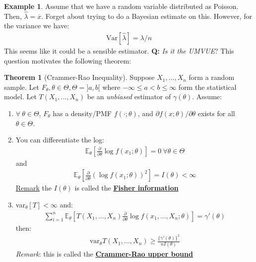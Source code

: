 \documentclass[11pt]{scrartcl}
\theoremstyle{definition}
\newtheorem{theorem}{Theorem}
\newtheorem{ex}{Example}
\theoremstyle{remark}
\newcommand{\dfn}[1]{\textbf{\underline{#1}}}
\newcommand{\EXth}[1]{\mathbb{E}_\theta \left[ #1 \right]}
\begin{document}
\begin{ex} 
Assume that we have a random variable distributed as Poisson. Then, $\hat{\lambda} = \overline{x}$. Forget about trying to do a Bayesian estimate on this. However, for the variance we have: 
	\begin{align*}
		\text{Var}[\hat{\lambda}] = \lambda / n 
	\end{align*}
	This seems like it could be a sensible estimator. \textbf{Q:} \emph{Is it the UMVUE}? This question motivates the following theorem: 
\end{ex}

\begin{theorem}[Crammer-Rao Inequality]
	Suppose $X_1, ..., X_n$ form a random sample. Let $F_\theta, \theta \in \Theta, \Theta = ]a,b[$ where $-\infty \leq a < b \leq \infty$ form the statistical model. Let $T(X_1, ..., X_n)$ be an \emph{unbiased} estimator of $\gamma(\theta)$. Assume: 
	\begin{enumerate}[noitemsep]
		\item $\forall\ \theta \in \Theta$, $F_\theta$ has a density/PMF $f(\cdot; \theta)$, and $\partial f(x; \theta) / \partial \theta$ exists for all $\theta \in \Theta$. 
		\item You can differentiate the log: 
		\begin{align*}
			\EXth{\frac{\partial}{\partial \theta} \log f(x_1; \theta)} = 0\ \forall \theta \in \Theta 	
		\end{align*}
		and 
		\begin{align*}
			\EXth{\frac{\partial}{\partial \theta} \left(  \log f(x_1; \theta) \right)^2 } = I(\theta) < \infty 	
		\end{align*}
		\underline{Remark} the $I(\theta)$ is called the \dfn{Fisher information}
		\item var$_\theta[T] < \infty$ and: 
		\begin{align*}
			\sum_{i=1}^n \EXth{T(X_1, ..., X_n) \frac{\partial}{\partial \theta} \log f(x_1, ..., X_n; \theta)} = \gamma'(\theta)  
		\end{align*}
		then: 
		\begin{align*}	
			\text{var}_\theta T(X_1, ..., X_n) \geq \frac{\{ \gamma'(\theta) \}^2}{nI(\theta)}	
		\end{align*}
		\emph{Remark}: this is called the \dfn{Crammer-Rao upper bound} 
	\end{enumerate}
\end{theorem}
\end{document}
